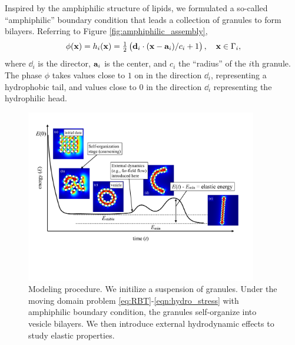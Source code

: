 Inspired
by the amphiphilic structure of lipids,
we formulated a so-called ``amphiphilic'' boundary condition
that leads a collection of granules to form bilayers.
Referring to Figure \ref{fig:amphiphilic_assembly}, 
\begin{equation}
\label{eq:amphiphilic_BC}
\phi(\mathbf{x}) = h_i(\mathbf{x}) = \tfrac{1}{2}\left(\dd_i \cdot (\xx - \aa_i)/c_i + 1\right), \quad
\mathbf{x} \in \Gamma_i,
\end{equation}
where $\dd_i$ is the director, $\aa_i$ is the center, and $c_i$ the
``radius'' of the $i$th granule.  
The phase $\phi$ takes values close to $1$ on in the direction $\dd_i$,
representing a hydrophobic tail, and values close to $0$ 
in the direction $\dd_i$ representing the hydrophilic head.

\begin{figure}[t!]
\begin{center}
\includegraphics[width=0.9\textwidth]{figures/Background/coarsening.pdf}
\end{center}
\vspace{-20pt}
\caption{\label{fig:coarsening}
Modeling procedure.
We initilize a suspension of granules.
Under the moving domain problem
\eqref{eq:RBT}-\eqref{eqn:hydro_stress}
with amphiphilic boundary condition, the granules
self-organize into vesicle bilayers.
We then introduce external hydrodynamic effects to study elastic properties.
}
\vspace{5pt}
\end{figure}
